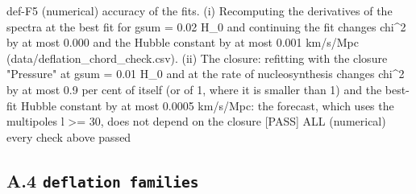 \documentclass[
  10pt,
]{article}
\newenvironment{Shaded}{}{}
\newcommand{\NormalTok}[1]{#1}
\begin{document}
\begin{Shaded}
\begin{Highlighting}[]
\NormalTok{[PASS] def{-}F5  (numerical) accuracy of the fits. (i) Recomputing the derivatives of the spectra at the best fit for gsum = 0.02 H\_0 and continuing the fit changes chi\^{}2 by at most 0.000 and the Hubble constant by at most 0.001 km/s/Mpc (data/deflation\_chord\_check.csv). (ii) The closure: refitting with the closure "Pressure" at gsum = 0.01 H\_0 and at the rate of nucleosynthesis changes chi\^{}2 by at most 0.9 per cent of itself (or of 1, where it is smaller than 1) and the best{-}fit Hubble constant by at most 0.0005 km/s/Mpc: the forecast, which uses the multipoles l \textgreater{}= 30, does not depend on the closure}
\NormalTok{[PASS] ALL  (numerical) every check above passed}
\end{Highlighting}
\end{Shaded}

\hypertarget{a.4-deflation-families}{%
\subsection{\texorpdfstring{A.4
\texttt{deflation\ families}}{A.4 deflation families}}\label{a.4-deflation-families}}
\end{document}
